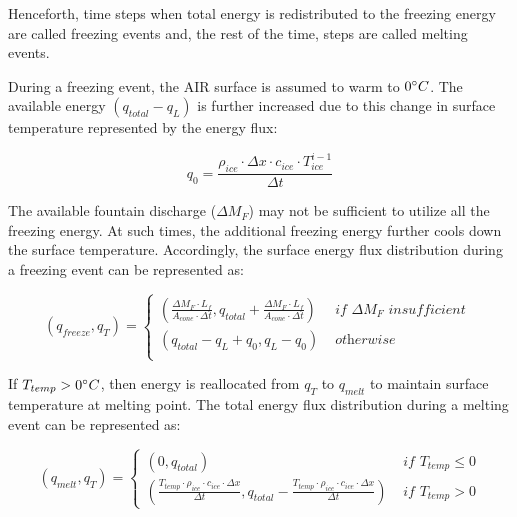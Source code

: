 Henceforth, time steps when total energy is redistributed to the freezing energy are called freezing
events and, the rest of the time, steps are called melting events.


During a freezing event, the \ac{AIR} surface is assumed to warm to $0 ^{\circ} C$. The available energy
$(q_{total}-q_{L})$ is further increased due to this change in surface temperature represented by the energy
flux:

$$q_{0} = \frac{\rho_{ice} \cdot \Delta x \cdot c_{ice} \cdot T_{ice}^{i-1}}{\Delta t}$$

The available fountain discharge ($\Delta M_{F}$) may not be sufficient to utilize all the freezing energy. At such times,
the additional freezing energy further cools down the surface temperature. Accordingly, the surface energy flux
distribution during a freezing event can be represented as:

\begin{equation}
	(q_{freeze}, q_{T}) = \left\{ \begin{array}{ll}
		(\frac{\Delta M_{F} \cdot L_f
		}{A_{cone} \cdot \Delta t}
		, q_{total}+\frac{\Delta M_{F} \cdot L_f
		}{A_{cone} \cdot \Delta t})          & \textit{ if  } \Delta M_{F} \textit{ insufficient } \\
		(q_{total}-q_{L}+q_{0}, q_{L}-q_{0}) & \textit{ otherwise }                                \\
	\end{array} \right.
\end{equation}

If $T_{temp} > 0 ^{\circ} C$, then energy is reallocated from $q_{T}$ to $q_{melt}$ to maintain surface
temperature at melting point. The total energy flux distribution during a melting event can be represented as:

\begin{equation}
	(q_{melt}, q_{T}) = \left\{ \begin{array}{ll}
		(0, q_{total})
		                                                                                                                                                               & \textit{ if } T_{temp} \leq 0 \\
		(\frac{T_{temp} \cdot \rho_{ice} \cdot c_{ice} \cdot \Delta x}{\Delta t}, q_{total}-\frac{T_{temp} \cdot \rho_{ice} \cdot c_{ice} \cdot \Delta x}{\Delta t}  ) & \textit{ if } T_{temp} > 0
	\end{array} \right.
\end{equation}

